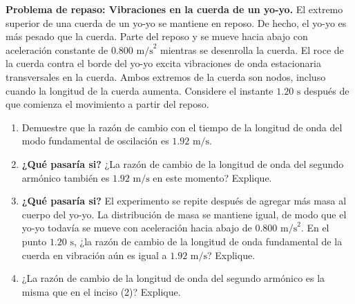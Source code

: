 \item \textbf{Problema de repaso: Vibraciones en la cuerda de un yo-yo.}
El extremo superior de una cuerda de un yo-yo se mantiene en reposo. De hecho, el yo-yo es más pesado que la cuerda. Parte del reposo y se mueve hacia abajo con aceleración constante de $0.800\text{ m/s}^2$ mientras se desenrolla la cuerda. El roce de la cuerda contra el borde del yo-yo excita vibraciones de onda estacionaria transversales en la cuerda. Ambos extremos de la cuerda son nodos, incluso cuando la longitud de la cuerda aumenta. Considere el instante $1.20\text{ s}$ después de que comienza el movimiento a partir del reposo.
\begin{enumerate}
    \item Demuestre que la razón de cambio con el tiempo de la longitud de onda del modo fundamental de oscilación es $1.92\text{ m/s}$.
    \item \textbf{¿Qué pasaría si?} ¿La razón de cambio de la longitud de onda del segundo armónico también es $1.92\text{ m/s}$ en este momento? Explique.
    \item \textbf{¿Qué pasaría si?} El experimento se repite después de agregar más masa al cuerpo del yo-yo. La distribución de masa se mantiene igual, de modo que el yo-yo todavía se mueve con aceleración hacia abajo de $0.800\text{ m/s}^2$. En el punto $1.20\text{ s}$, ¿la razón de cambio de la longitud de onda fundamental de la cuerda en vibración aún es igual a $1.92\text{ m/s}$? Explique.
    \item ¿La razón de cambio de la longitud de onda del segundo armónico es la misma que en el inciso (2)? Explique.
\end{enumerate}